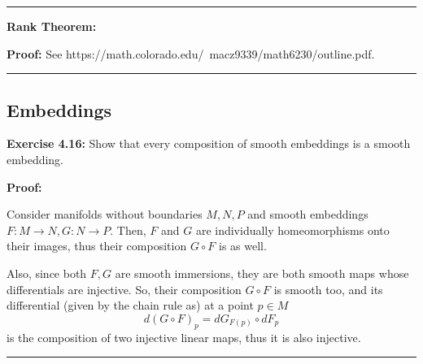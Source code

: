 \documentclass{article}
\begin{document}
\vskip 0.5cm
\hrule
\vskip 0.5cm

\textbf{Rank Theorem:} 
\vskip 0.5cm

\textbf{Proof:}
See https://math.colorado.edu/~macz9339/math6230/outline.pdf.


\vskip 0.5cm
\hrule
\vskip 0.5cm

\subsection{Embeddings}

\textbf{Exercise 4.16:} Show that every composition of smooth embeddings is a smooth embedding. 
\vskip 0.5cm

\textbf{Proof:}


Consider manifolds without boundaries $M, N, P$ and smooth embeddings $F : M \rightarrow N, G : N \rightarrow P$. Then, $F$ and $G$ are individually homeomorphisms onto their images, thus their composition $G \circ F$ is as well. 

\vskip 0.25cm
Also, since both $F, G$ are smooth immersions, they are both smooth maps whose differentials are injective. So, their composition $G \circ F$ is smooth too, and its differential (given by the chain rule as) at a point $p \in M$
\[ d\left(G \circ F\right)_{p} = dG_{F(p)} \circ dF_{p} \]
is the composition of two injective linear maps, thus it is also injective.

\vskip 0.5cm
\hrule
\vskip 0.5cm






\end{document}
